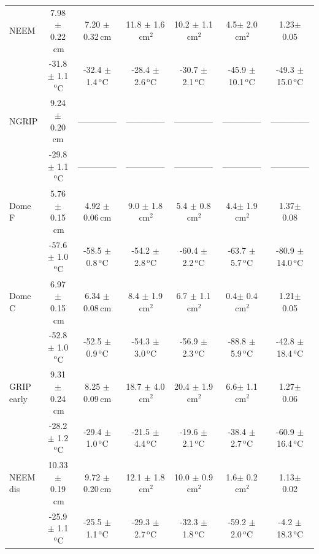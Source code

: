 \documentclass[11pt, draftcls, onecolumn]{IEEEtran} %
\numberwithin{equation}{section}
\numberwithin{table}{section}
\numberwithin{figure}{section}
\begin{document}
\begin{table}[]
\begin{tabular}{l c c c c c c}
		NEEM&7.98 $\pm$ 0.22$\,\mathrm{cm}$& 7.20 $\pm$ 0.32$\,\mathrm{cm}$& 11.8 $\pm$ 1.6$\,\mathrm{cm}^2$& 10.2 $\pm$ 1.1$\,\mathrm{cm}^2$& 4.5$\pm$ 2.0$\,\mathrm{cm}^2$& 1.23$\pm$ 0.05\\
		& -31.8 $\pm$ 1.1$\,^\mathrm{o}$C & -32.4 $\pm$ 1.4$\,^\mathrm{o}$C& -28.4 $\pm$ 2.6$\,^\mathrm{o}$C& -30.7 $\pm$ 2.1$\,^\mathrm{o}$C& -45.9 $\pm$ 10.1$\,^\mathrm{o}$C& -49.3 $\pm$ 15.0$\,^\mathrm{o}$C\\
		
		NGRIP &9.24 $\pm$ 0.20 $\mathrm{cm}$&-------------- &--------------&-------------- & --------------&-------------- \\
		& -29.8 $\pm$ 1.1$\,^\mathrm{o}$C &--------------& --------------& --------------& --------------&--------------\\	
		
		Dome F&5.76 $\pm$ 0.15$\,\mathrm{cm}$& 4.92 $\pm$ 0.06$\,\mathrm{cm}$& 9.0 $\pm$ 1.8$\,\mathrm{cm}^2$& 5.4 $\pm$ 0.8$\,\mathrm{cm}^2$& 4.4$\pm$ 1.9$\,\mathrm{cm}^2$& 1.37$\pm$ 0.08\\
		& -57.6 $\pm$ 1.0$\,^\mathrm{o}$C & -58.5 $\pm$ 0.8$\,^\mathrm{o}$C& -54.2 $\pm$ 2.8$\,^\mathrm{o}$C& -60.4 $\pm$ 2.2$\,^\mathrm{o}$C& -63.7 $\pm$ 5.7$\,^\mathrm{o}$C& -80.9 $\pm$ 14.0$\,^\mathrm{o}$C\\
		
		Dome C &6.97 $\pm$ 0.15$\,\mathrm{cm}$& 6.34 $\pm$ 0.08$\,\mathrm{cm}$& 8.4 $\pm$ 1.9$\,\mathrm{cm}^2$& 6.7 $\pm$ 1.1$\,\mathrm{cm}^2$& 0.4$\pm$ 0.4$\,\mathrm{cm}^2$& 1.21$\pm$ 0.05\\
		& -52.8 $\pm$ 1.0$\,^\mathrm{o}$C & -52.5 $\pm$ 0.9$\,^\mathrm{o}$C& -54.3 $\pm$ 3.0$\,^\mathrm{o}$C& -56.9 $\pm$ 2.3$\,^\mathrm{o}$C& -88.8 $\pm$ 5.9$\,^\mathrm{o}$C& -42.8 $\pm$ 18.4$\,^\mathrm{o}$C\\
		
		GRIP early &9.31 $\pm$ 0.24$\,\mathrm{cm}$& 8.25 $\pm$ 0.09$\,\mathrm{cm}$& 18.7 $\pm$ 4.0$\,\mathrm{cm}^2$& 20.4 $\pm$ 1.9$\,\mathrm{cm}^2$& 6.6$\pm$ 1.1$\,\mathrm{cm}^2$& 1.27$\pm$ 0.06\\
		& -28.2 $\pm$ 1.2$\,^\mathrm{o}$C & -29.4 $\pm$ 1.0$\,^\mathrm{o}$C& -21.5 $\pm$ 4.4$\,^\mathrm{o}$C& -19.6 $\pm$ 2.1$\,^\mathrm{o}$C& -38.4 $\pm$ 2.7$\,^\mathrm{o}$C& -60.9 $\pm$ 16.4$\,^\mathrm{o}$C\\
		
		NEEM dis &10.33 $\pm$ 0.19$\,\mathrm{cm}$& 9.72 $\pm$ 0.20$\,\mathrm{cm}$& 12.1 $\pm$ 1.8$\,\mathrm{cm}^2$& 10.0 $\pm$ 0.9$\,\mathrm{cm}^2$& 1.6$\pm$ 0.2$\,\mathrm{cm}^2$& 1.13$\pm$ 0.02\\
		& -25.9 $\pm$ 1.1$\,^\mathrm{o}$C & -25.5 $\pm$ 1.1$\,^\mathrm{o}$C& -29.3 $\pm$ 2.7$\,^\mathrm{o}$C& -32.3 $\pm$ 1.8$\,^\mathrm{o}$C& -59.2 $\pm$ 2.0$\,^\mathrm{o}$C& -4.2 $\pm$ 18.3$\,^\mathrm{o}$C\\
		

\end{tabular}
\end{table}
\end{document}
